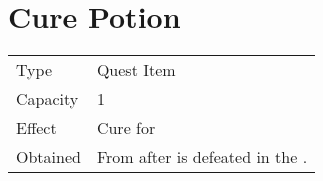\section{Cure Potion}
\label{item:cure_potion_uniq}


\noindent\begin{tabularx}{\textwidth}[l]{lX}
	Type
	& Quest Item
\\
	Capacity
	& 1
\\
	Effect
	& Cure for \nameref{char:kaeli}
\\
	Obtained
	& From \nameref{char:tristam} after \nameref{monster:flamerus_rex} is defeated in the \nameref{map:bone_dungeon}.
\end{tabularx}
